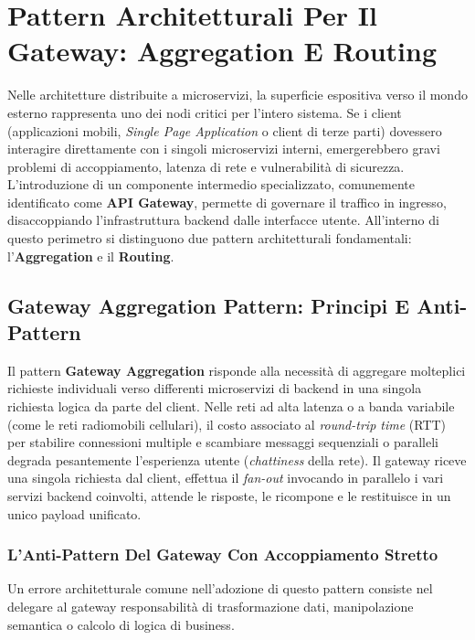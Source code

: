 \documentclass[11pt, a4paper]{article}
\begin{document}

\section{Pattern Architetturali Per Il Gateway: Aggregation E Routing}

Nelle architetture distribuite a microservizi, la superficie espositiva verso il mondo esterno rappresenta uno dei nodi critici per l'intero sistema. Se i client (applicazioni mobili, \emph{Single Page Application} o client di terze parti) dovessero interagire direttamente con i singoli microservizi interni, emergerebbero gravi problemi di accoppiamento, latenza di rete e vulnerabilità di sicurezza. L'introduzione di un componente intermedio specializzato, comunemente identificato come \textbf{API Gateway}, permette di governare il traffico in ingresso, disaccoppiando l'infrastruttura backend dalle interfacce utente. All'interno di questo perimetro si distinguono due pattern architetturali fondamentali: l'\textbf{Aggregation} e il \textbf{Routing}.

\subsection{Gateway Aggregation Pattern: Principi E Anti-Pattern}

Il pattern \textbf{Gateway Aggregation} risponde alla necessità di aggregare molteplici richieste individuali verso differenti microservizi di backend in una singola richiesta logica da parte del client. Nelle reti ad alta latenza o a banda variabile (come le reti radiomobili cellulari), il costo associato al \emph{round-trip time} (RTT) per stabilire connessioni multiple e scambiare messaggi sequenziali o paralleli degrada pesantemente l'esperienza utente (\emph{chattiness} della rete). Il gateway riceve una singola richiesta dal client, effettua il \emph{fan-out} invocando in parallelo i vari servizi backend coinvolti, attende le risposte, le ricompone e le restituisce in un unico payload unificato.

\subsubsection{L'Anti-Pattern Del Gateway Con Accoppiamento Stretto}

Un errore architetturale comune nell'adozione di questo pattern consiste nel delegare al gateway responsabilità di trasformazione dati, manipolazione semantica o calcolo di logica di business.
\end{document}
